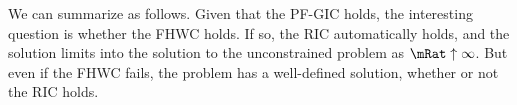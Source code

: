\documentclass[../BufferStockTheory.tex]{subfiles}
\begin{document}
\begin{comment}
We can obtain a more exact approximation to the correct ${n}$ by defining
\begin{eqnarray}
\nabla(n) \equiv   \lim_{n \rightarrow \infty}\Rnorm^{n}\mathbb{C}_{t-n}^{t}-\Rnorm^{n}\mathbb{C}_{t-n}^{t} & = &  \left(\frac{\PatR^{-n}}{1-\PatR}\right).
\end{eqnarray}
from which we can obtain the difference between the approximate and the exact $\mathbb{C}_{t-n}^{t}$ as $\Rnorm^{-n}\nabla(n)$ and


For this $n$ and
$\bRat$ we can obtain the corresponding
$\cRat=\PatPGro^{-\nFunc(\bRat)}$.  Note, however, that this is {\it not}
the level of $\cRat$ directly associated with $\bRat$ on the true
consumption function, because we used only a limiting approximation to
the correct $n$ rather than the correct $n$.

Our strategy, in this case, is

The limiting difference can be obtained by realizing that
\begin{eqnarray}
\nabla(n) \equiv   \lim_{n \rightarrow \infty}\Rnorm^{n}\mathbb{C}_{t-n}^{t}-\Rnorm^{n}\mathbb{C}_{t-n}^{t} & = &  \left(\frac{\PatR^{-n}}{1-\PatR}\right).
\end{eqnarray}
and so

\end{comment}

We can summarize as follows.  Given that the PF-GIC holds, the
interesting question is whether the FHWC holds.  If so, the
RIC automatically holds, and the solution limits
into the solution to the unconstrained problem as $\mRat \uparrow
\infty$.  But even if the FHWC fails, the problem has a
well-defined solution, whether or not the RIC holds.

\end{document}
